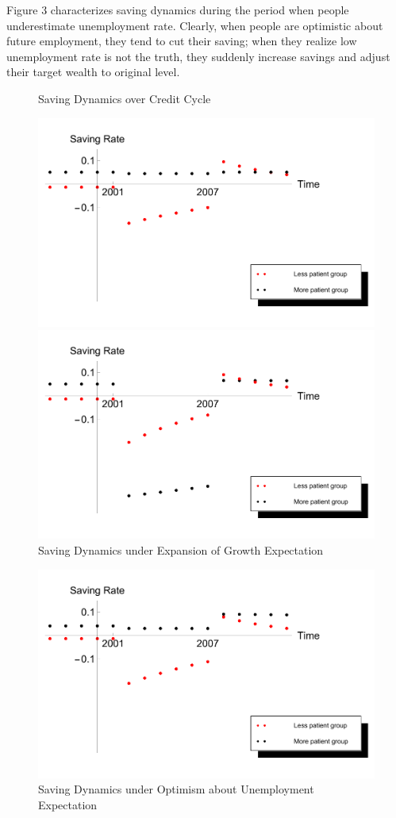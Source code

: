 \documentclass[titlepage,abstract,letterpaper]{econtex}
\begin{document}
\begin{enumerate}
Figure 3 characterizes saving dynamics during the period when people underestimate unemployment rate. Clearly, when people are optimistic about future employment, they tend to cut their saving; when they realize low unemployment rate is not the truth, they suddenly increase savings and adjust their target wealth to original level.
\end{enumerate}


\begin{figure}
\caption{Saving Dynamics over Credit Cycle}
\includegraphics[width=6in]{../Figures/SavPathOverECreditCycle}

\caption{Saving Dynamics under Expansion of Growth Expectation}
\includegraphics[width=6in]{../Figures/SavPathOverEGrowthCycle}
\end{figure}
\begin{figure}
\caption{Saving Dynamics under Optimism about Unemployment Expectation}
\includegraphics[width=6in]{../Figures/SavPathOverEUriskCycle}
\end{figure}


\end{document}
